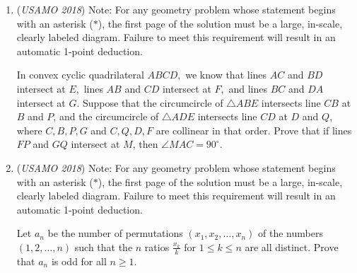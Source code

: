 \begin{enumerate}
 

	\item (\textit{USAMO 2018}) Note: For any geometry problem whose statement begins with an asterisk ($*$), the first page of the solution must be a large, in-scale, clearly labeled diagram. Failure to meet this requirement will result in an automatic 1-point deduction.


 In convex cyclic quadrilateral $ABCD,$ we know that lines $AC$ and $BD$ intersect at $E,$ lines $AB$ and $CD$ intersect at $F,$ and lines $BC$ and $DA$ intersect at $G.$ Suppose that the circumcircle of $\triangle ABE$ intersects line $CB$ at $B$ and $P$, and the circumcircle of $\triangle ADE$ intersects line $CD$ at $D$ and $Q$, where $C,B,P,G$ and $C,Q,D,F$ are collinear in that order. Prove that if lines $FP$ and $GQ$ intersect at $M$, then $\angle MAC = 90^{\circ}.$


	\item (\textit{USAMO 2018}) Note: For any geometry problem whose statement begins with an asterisk ($*$), the first page of the solution must be a large, in-scale, clearly labeled diagram. Failure to meet this requirement will result in an automatic 1-point deduction.


 Let $a_n$ be the number of permutations $(x_1, x_2, \dots, x_n)$ of the numbers $(1,2,\dots, n)$ such that the $n$ ratios $\frac{x_k}{k}$ for $1\le k\le n$ are all distinct. Prove that $a_n$ is odd for all $n\ge 1.$


\end{enumerate}